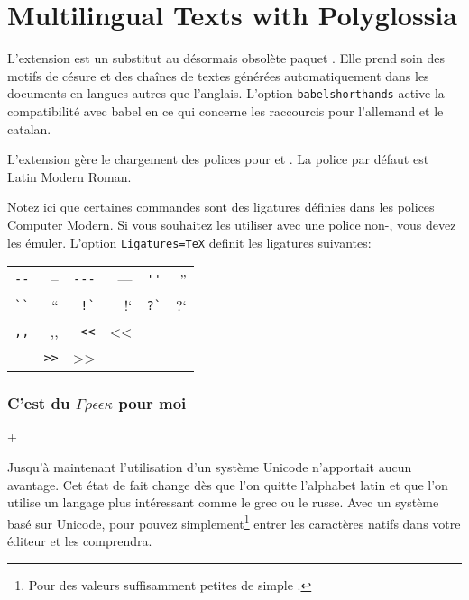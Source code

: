 \section{Multilingual Texts with Polyglossia}
%
L'extension \cite{polyglossia} est un substitut au désormais obsolète paquet
. Elle prend soin des motifs de césure et des chaînes de
textes générées automatiquement dans les documents en langues autres que l'anglais. L'option \verb|babelshorthands|
active la compatibilité avec babel en ce qui concerne les raccourcis
pour l'allemand et le catalan.

L'extension \cite{fontspec} gère le chargement des
polices pour  et . La police par défaut
est Latin Modern Roman.

Notez ici
que certaines commandes  sont des ligatures définies dans
les polices Computer Modern. Si vous souhaitez les utiliser avec une
police non-, vous devez les émuler. L'option
\texttt{Ligatures=TeX} definit les ligatures suivantes:

\begin{tabular}{rr@{~~~~}rr@{~~~~}rr}
\verb|--|	& -- & \verb|---|	& --- & \verb|''|	& ''\\
\verb|``|	& `` & \verb|!`|	& !`  &  \verb|?`|	& ?`\\
\verb|,,|	& ,, & \verb|<<|	& <<\\ & \verb|>>|	& >>\\
\end{tabular}


\subsubsection{C'est du $\Gamma\rho\epsilon\epsilon\kappa$ pour moi}
+%

Jusqu'à maintenant l'utilisation d'un système  Unicode
n'apportait aucun avantage. Cet état de fait change dès que l'on
quitte l'alphabet latin et que l'on utilise un langage plus
intéressant comme le grec ou le russe. Avec un système basé sur
Unicode, pour pouvez simplement\footnote{Pour des valeurs suffisamment
  petites de \og simple \fg.} entrer les caractères natifs dans votre éditeur
et  les comprendra.

